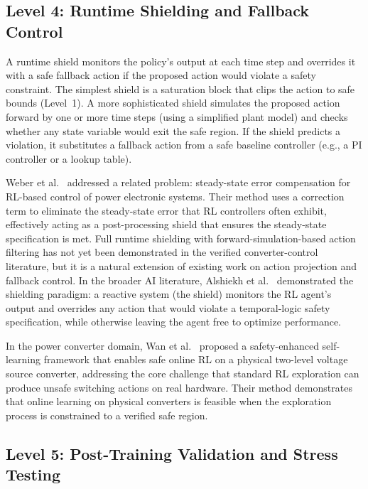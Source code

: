 \documentclass[manuscript,screen,review]{acmart}
\begin{document}
\subsection{Level 4: Runtime Shielding and Fallback Control}

A runtime shield monitors the policy's output at each time step and overrides it with a safe fallback action if the proposed action would violate a safety constraint.
The simplest shield is a saturation block that clips the action to safe bounds (Level~1).
A more sophisticated shield simulates the proposed action forward by one or more time steps (using a simplified plant model) and checks whether any state variable would exit the safe region.
If the shield predicts a violation, it substitutes a fallback action from a safe baseline controller (e.g., a PI controller or a lookup table).

Weber et al.~\cite{weber2023steady} addressed a related problem: steady-state error compensation for RL-based control of power electronic systems.
Their method uses a correction term to eliminate the steady-state error that RL controllers often exhibit, effectively acting as a post-processing shield that ensures the steady-state specification is met.
Full runtime shielding with forward-simulation-based action filtering has not yet been demonstrated in the verified converter-control literature, but it is a natural extension of existing work on action projection and fallback control.
In the broader AI literature, Alshiekh et al.~\cite{alshiekh2018safe} demonstrated the shielding paradigm: a reactive system (the shield) monitors the RL agent's output and overrides any action that would violate a temporal-logic safety specification, while otherwise leaving the agent free to optimize performance.

In the power converter domain, Wan et al.~\cite{wan2024safety} proposed a safety-enhanced self-learning framework that enables safe online RL on a physical two-level voltage source converter, addressing the core challenge that standard RL exploration can produce unsafe switching actions on real hardware.
Their method demonstrates that online learning on physical converters is feasible when the exploration process is constrained to a verified safe region.

\subsection{Level 5: Post-Training Validation and Stress Testing}
\end{document}
